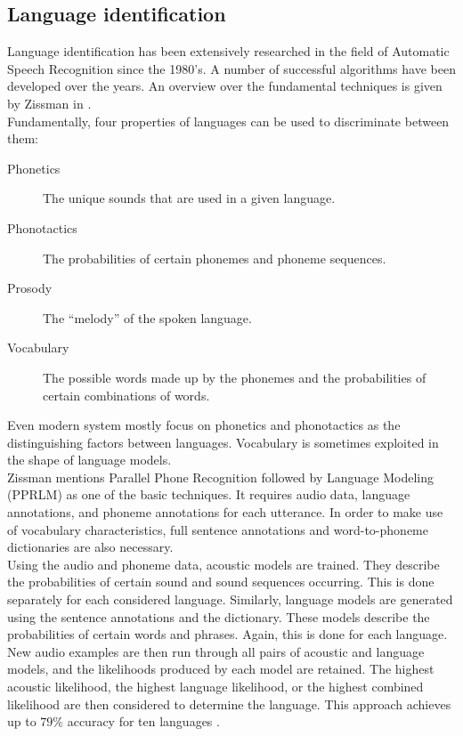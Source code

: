 \subsection{Language identification}
Language identification has been extensively researched in the field of Automatic Speech Recognition since the 1980's. A number of successful algorithms have been developed over the years. An overview over the fundamental techniques is given by Zissman in \cite{zissman}.\\
Fundamentally, four properties of languages can be used to discriminate between them:
\begin{description}
	\item[Phonetics] The unique sounds that are used in a given language.
	\item[Phonotactics] The probabilities of certain phonemes and phoneme sequences.
	\item[Prosody] The ``melody'' of the spoken language.
	\item[Vocabulary] The possible words made up by the phonemes and the probabilities of certain combinations of words.
\end{description}
Even modern system mostly focus on phonetics and phonotactics as the distinguishing factors between languages. Vocabulary is sometimes exploited in the shape of language models.\\
Zissman mentions Parallel Phone Recognition followed by Language Modeling (PPRLM) as one of the basic techniques. It requires audio data, language annotations, and phoneme annotations for each utterance. In order to make use of vocabulary characteristics, full sentence annotations and word-to-phoneme dictionaries are also necessary.\\
Using the audio and phoneme data, acoustic models are trained. They describe the probabilities of certain sound and sound sequences occurring. This is done separately for each considered language. Similarly, language models are generated using the sentence annotations and the dictionary. These models describe the probabilities of certain words and phrases. Again, this is done for each language.\\
New audio examples are then run through all pairs of acoustic and language models, and the likelihoods produced by each model are retained. The highest acoustic likelihood, the highest language likelihood, or the highest combined likelihood are then considered to determine the language. This approach achieves up to $79\%$ accuracy for ten languages \cite{muthusamy}.\\
